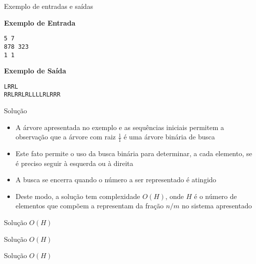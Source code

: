 \begin{frame}[fragile]{Exemplo de entradas e saídas}

\begin{minipage}[t]{0.5\textwidth}
\textbf{Exemplo de Entrada}
\begin{verbatim}
5 7
878 323
1 1
\end{verbatim}
\end{minipage}
\begin{minipage}[t]{0.45\textwidth}
\textbf{Exemplo de Saída}
\begin{verbatim}
LRRL
RRLRRLRLLLLRLRRR
\end{verbatim}
\end{minipage}
\end{frame}

\begin{frame}[fragile]{Solução}

    \begin{itemize}
        \item A árvore apresentada no exemplo e as sequências iniciais permitem a observação
            que a árvore com raiz $\frac{1}{1}$ é uma árvore binária de busca

        \item Este fato permite o uso da busca binária para determinar, a cada elemento, se é 
            preciso seguir à esquerda ou à direita

        \item A busca se encerra quando o número a ser representado é atingido

        \item Deste modo, a solução tem complexidade $O(H)$, onde $H$ é o número
            de elementos que compõem a representam da fração $n/m$ no sistema apresentado
   \end{itemize}

\end{frame}

\begin{frame}[fragile]{Solução $O(H)$}
\end{frame}

\begin{frame}[fragile]{Solução $O(H)$}
\end{frame}

\begin{frame}[fragile]{Solução $O(H)$}
\end{frame}
